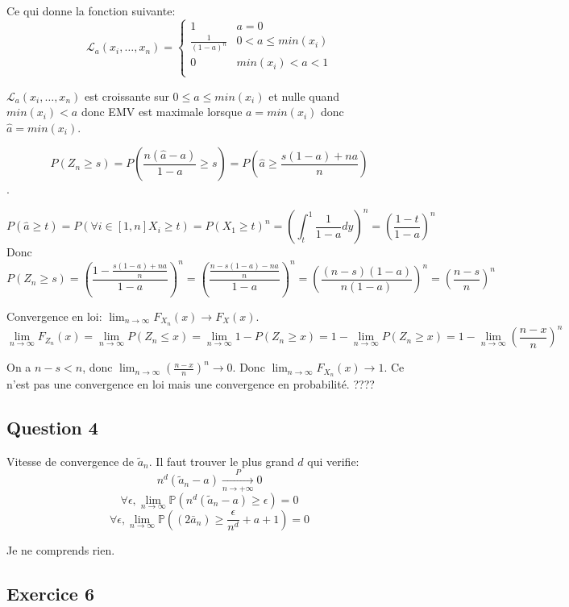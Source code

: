\documentclass[]{book}
\theoremstyle{definition}
\begin{document}
Ce qui donne la fonction suivante:
$$
\mathcal{L}_a(x_i,\ldots,x_n) =     
\left\{
    \begin{array}{cc}
        1 &  a = 0 \\
        \frac{1}{(1-a)^n} & 0 < a \leq min(x_i)\\
        0 & min(x_i) < a < 1 \\
    \end{array}
\right.
$$ 

$\mathcal{L}_a(x_i,\ldots,x_n)$ est croissante sur $0 \leq a \leq min(x_i)$ et nulle quand $min(x_i) < a$ donc EMV est maximale lorsque $a=min(x_i)$ donc $\hat{a}=min(x_i)$.  


$$
P(Z_{n} \geq s) = P\left(\frac{n(\hat{a}-a)}{1-a} \geq s\right) = P\left(\hat{a} \geq \frac{s(1-a)+na}{n}\right) 
$$.


$$
P(\hat{a} \geq t) = P(\forall i \in [1,n] X_i \geq t) = P(X_1 \geq t)^n = \left(\int_{t}^{1}{\frac{1}{1-a}dy}\right)^n = \left(\frac{1-t}{1-a}\right)^n
$$
Donc
$$
P(Z_{n} \geq s) = \left(\frac{1-\frac{s(1-a)+na}{n}}{1-a}\right)^n = \left(\frac{\frac{n-s(1-a)-na}{n}}{1-a}\right)^n = \left(\frac{(n-s)(1-a)}{n(1-a)}\right)^n = \left(\frac{n-s}{n}\right)^n
$$

Convergence en loi: $\lim_{n \to \infty} F_{X_n}(x) \to F_X(x)$.
$$
\lim_{n \to \infty} F_{Z_n}(x) = \lim_{n \to \infty} P({Z_n} \leq x) = \lim_{n \to \infty} 1- P({Z_n} \geq x) = 1 - \lim_{n \to \infty} P({Z_n} \geq x) = 1 - \lim_{n \to \infty} \left(\frac{n-x}{n}\right)^n
$$

On a $n-s <n$, donc $\lim_{n \to \infty} \left(\frac{n-x}{n}\right)^n \to 0$. Donc $\lim_{n \to \infty} F_{X_n}(x) \to 1$. 
Ce n'est pas une convergence en loi mais une convergence en probabilit\'e. ???? 


\subsection*{Question 4}
Vitesse de convergence de $\tilde{a}_n$.
Il faut trouver le plus grand $d$ qui verifie:
$$
n^d(\tilde{a}_n-a) \xrightarrow[n \to +\infty]{P} 0
$$
$$
\forall \epsilon, \lim_{n \to \infty}{\mathbb{P}(n^d(\tilde{a}_n-a) \geq \epsilon)} = 0
$$
$$
\forall \epsilon, \lim_{n \to \infty}{\mathbb{P}((2\bar{a}_n) \geq \frac{\epsilon}{n^d} +a+1)} = 0
$$

Je ne comprends rien.

\subsection*{Exercice 6}
\end{document}
